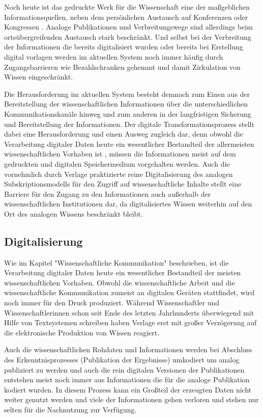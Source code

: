 Noch heute ist das gedruckte Werk für die Wissenschaft eine der maßgeblichen Informationsquellen, neben dem persönlichen Austausch auf Konferenzen oder Kongressen \cite{winkler_2011_anforderungen}. Analoge Publikationen und Verbreitungswege sind allerdings beim ortsübergreifenden Austausch stark beschränkt. Und selbst bei der Verbreitung der Informationen die bereits digitalisiert wurden oder bereits bei Erstellung digital vorlagen werden im aktuellen System noch immer häufig durch Zugangsbarrieren wie Bezahlschranken gehemmt und damit Zirkulation von Wissen eingeschränkt.

Die Herausforderung im aktuellen System besteht demnach zum Einen aus der Bereitstellung der wissenschaftlichen Informationen über die unterschiedlichen Kommunikationskanäle hinweg und zum anderen in der langfristigen Sicherung und Bereitstellung der Informationen. Der digitale Transformationsprozess stellt dabei eine Herausforderung und einen Ausweg zugleich dar, denn obwohl die Verarbeitung digitaler Daten heute ein wesentlicher Bestandteil der allermeisten wissenschaftlichen Vorhaben ist \cite{winkler_2011_anforderungen}, müssen die Informationen meist auf dem gedruckten und digitalen Speichermedium vorgehalten werden. Auch die vornehmlich durch Verlage praktizierte reine Digitalisierung des analogen Subskriptionsmodells für den Zugriff auf wissenschaftliche Inhalte \cite{Hanekop_2014} \cite{boai_2012} stellt eine Barriere für den Zugang zu den Informationen auch außerhalb der wissenschaftlichen Institutionen dar, da digitalisiertes Wissen weiterhin auf den Ort des analogen Wissens beschränkt bleibt.

\subsection{Digitalisierung}

Wie im Kapitel "Wissenschaftliche Kommunikation" beschrieben, ist die Verarbeitung digitaler Daten heute ein wesentlicher Bestandteil der meisten wissenschaftlichen Vorhaben. Obwohl die wissenschaftliche Arbeit und die wissenschaftliche Kommunikation zumeist an digitalen Geräten stattfindet, wird noch immer für den Druck produziert. Während Wissenschaftler und Wissenschaftlerinnen schon seit Ende des letzten Jahrhunderts überwiegend mit Hilfe von Textsystemen schreiben \cite{Brueggemann-Klein_1995} \cite{bjork_2004_open} haben Verlage erst mit großer Verzögerung auf die elektronische Produktion von Wissen reagiert.

Auch die wissenschaftlichen Rohdaten und Informationen werden bei Abschluss des Erkenntnisprozesses (Publikation der Ergebnisse) umkodiert um analog publiziert zu werden und auch die rein digitalen Versionen der Publikationen entstehen meist noch immer aus Informationen die für die analoge Publikation kodiert wurden. In diesem Prozess kann ein Großteil der erzeugten Daten nicht weiter genutzt werden und viele der Informationen gehen verloren und stehen nur selten für die Nachnutzung zur Verfügung.

